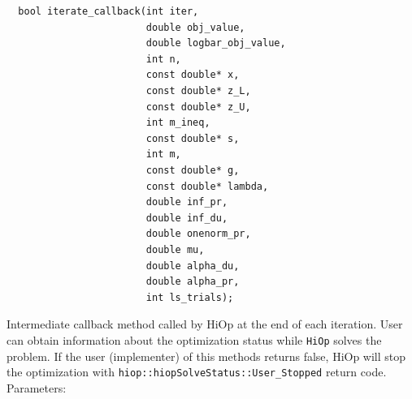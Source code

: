 \documentclass[11pt]{article}
\newcommand{\Hi}{\texttt{HiOp}\xspace}
\begin{document}
\begin{lstlisting} 
  bool iterate_callback(int iter,
                        double obj_value,
                        double logbar_obj_value,
                        int n,
                        const double* x,
                        const double* z_L,
                        const double* z_U,
                        int m_ineq,
                        const double* s,
                        int m,
                        const double* g,
                        const double* lambda,
                        double inf_pr,
                        double inf_du,
                        double onenorm_pr,
                        double mu,
                        double alpha_du,
                        double alpha_pr,
                        int ls_trials);
\end{lstlisting} 
Intermediate callback method called by HiOp at the end of each iteration. User can obtain information about the optimization status while \Hi solves the problem. If the user (implementer) of this methods returns false, HiOp will stop the optimization with \texttt{hiop::hiopSolveStatus::User\_Stopped} return code.
Parameters:
\end{document}

